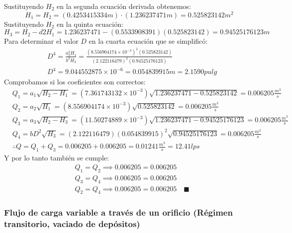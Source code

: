     Sustituyendo $H_2$ en la segunda ecuación derivada obtenemos:
    \begin{equation*}
        H_1 = H_2 = (0.4253415334m)\cdot (1.236237471m) = 0.525823142 m^2
    \end{equation*}
    Sustituyendo $H_2$ en la quinta ecuación:
    \begin{equation*}
        H_3 = H_2 -d2H_1 = 1.236237471 - (0.5533908391)(0.525823142) = 0.94525176123m
    \end{equation*}
    Para determinar el valor $D$ en la cuarta ecuación que se simplificó:
    \begin{align*}
        &D^4 = \frac{a_2^2 H_1}{b^2H_3} = \frac{\left(8.556904174 \times 10^{ - 3}\right)^2(0.525823142)}{\left(2.122116479\right)^2(0.94525176123)}\\ 
        &D^4 = 9.044552875 \times 10^{ - 6} = 0.054839915m = 2.1590 pulg
    \end{align*}
    Comprobamos si los coeficientes son correctos:
    \begin{align*}
        &Q_1 = a_1 \sqrt{H_2 - H_1} = \left(7.361743132 \times 10^{ - 3}\right) \sqrt{1.236237471 - 0.525823142} = 0.006205 \frac{m^3}{s}\\
        &Q_2 = a_2 \sqrt{H_1} = \left(8.556904174 \times 10^{ - 3}\right) \sqrt{0.525823142} = 0.006205 \frac{m^3}{s}\\
        &Q_3 = a_3 \sqrt{H_2 - H_3} = \left(11.50274889 \times 10^{ - 3}\right) \sqrt{1.236237471 - 0.94525176123} = 0.006205 \frac{m^3}{s}\\
        &Q_4 = bD^2 \sqrt{H_3} = (2.122116479)(0.054839915)^2 \sqrt{0.94525176123} = 0.006205 \frac{m^3}{s}\\ 
        &\therefore Q = Q_1 + Q_3 = 0.006205 + 0.006205 = 0.01241 \frac{m^3}{s} = 12.41 lps
    \end{align*}
    Y por lo tanto también se cumple:
    \begin{align*}
        &Q_1 = Q_2 \implies 0.006205 = 0.006205\\
        &Q_3 = Q_4 \implies 0.006205 = 0.006205\\
        &Q_2 = Q_4 \implies 0.006205 = 0.006205 \quad \blacksquare 
    \end{align*}


\subsubsection{Flujo de carga variable a través de un orificio (Régimen transitorio, vaciado de depósitos)}


